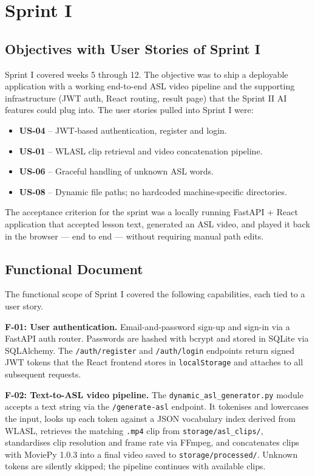 \documentclass[12pt,a4paper,oneside]{report}
\begin{document}
\section{Sprint I}

\subsection{Objectives with User Stories of Sprint I}

Sprint I covered weeks 5 through 12. The objective was to ship a deployable application with a working end-to-end ASL video pipeline and the supporting infrastructure (JWT auth, React routing, result page) that the Sprint II AI features could plug into. The user stories pulled into Sprint I were:

\begin{itemize}[leftmargin=2em,itemsep=0.1em]
  \item \textbf{US-04} -- JWT-based authentication, register and login.
  \item \textbf{US-01} -- WLASL clip retrieval and video concatenation pipeline.
  \item \textbf{US-06} -- Graceful handling of unknown ASL words.
  \item \textbf{US-08} -- Dynamic file paths; no hardcoded machine-specific directories.
\end{itemize}

The acceptance criterion for the sprint was a locally running FastAPI + React application that accepted lesson text, generated an ASL video, and played it back in the browser --- end to end --- without requiring manual path edits.

\subsection{Functional Document}

The functional scope of Sprint I covered the following capabilities, each tied to a user story.

\textbf{F-01: User authentication.} Email-and-password sign-up and sign-in via a FastAPI auth router. Passwords are hashed with bcrypt and stored in SQLite via SQLAlchemy. The \texttt{/auth/register} and \texttt{/auth/login} endpoints return signed JWT tokens that the React frontend stores in \texttt{localStorage} and attaches to all subsequent requests.

\textbf{F-02: Text-to-ASL video pipeline.} The \texttt{dynamic\_asl\_generator.py} module accepts a text string via the \texttt{/generate-asl} endpoint. It tokenises and lowercases the input, looks up each token against a JSON vocabulary index derived from WLASL, retrieves the matching \texttt{.mp4} clip from \texttt{storage/asl\_clips/}, standardises clip resolution and frame rate via FFmpeg, and concatenates clips with MoviePy 1.0.3 into a final video saved to \texttt{storage/processed/}. Unknown tokens are silently skipped; the pipeline continues with available clips.
\end{document}

